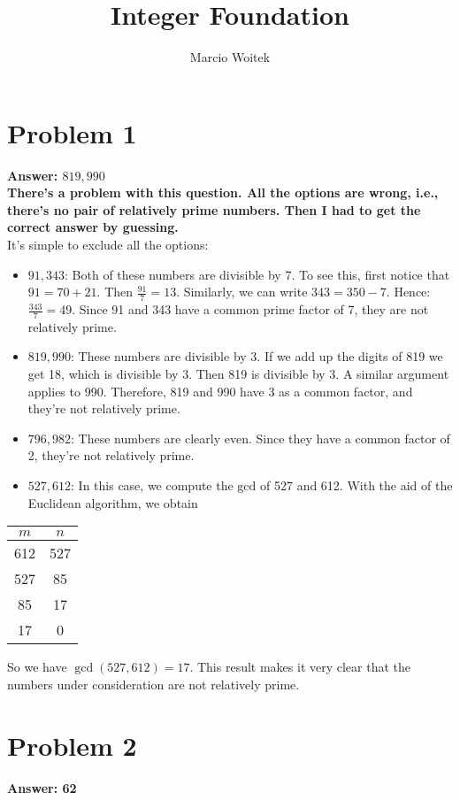 \documentclass[11pt]{article}
\author{Marcio Woitek}
\date{}
\title{Integer Foundation}
\begin{document}
\maketitle
\thispagestyle{empty}
\pagestyle{empty}
\section*{Problem 1}
\label{sec:org629dde8}
\textbf{Answer: \(819,990\)}\\

\textbf{There's a problem with this question. All the options are wrong, i.e., there's
no pair of relatively prime numbers. Then I had to get the correct answer by
guessing.}\\

It's simple to exclude all the options:
\begin{itemize}
\item \(91,343\): Both of these numbers are divisible by 7. To see this, first
notice that \(91=70+21\). Then \(\frac{91}{7}=13\). Similarly, we can
write \(343=350-7\). Hence: \(\frac{343}{7}=49\). Since 91 and 343 have a
common prime factor of 7, they are not relatively prime.
\item \(819,990\): These numbers are divisible by 3. If we add up the digits of
819 we get 18, which is divisible by 3. Then 819 is divisible by 3. A similar
argument applies to 990. Therefore, 819 and 990 have 3 as a common factor, and
they're not relatively prime.
\item \(796,982\): These numbers are clearly even. Since they have a common factor
of 2, they're not relatively prime.
\item \(527,612\): In this case, we compute the \(\mathrm{gcd}\) of 527 and 612.
With the aid of the Euclidean algorithm, we obtain
\end{itemize}
\begin{center}
\begin{tabular}{|c|c|}
\hline
\(m\) & \(n\)\\
\hline
612 & 527\\
527 & 85\\
85 & 17\\
17 & 0\\
\hline
\end{tabular}
\end{center}
So we have \(\gcd(527,612)=17\). This result makes it very clear that the
numbers under consideration are not relatively prime.
\section*{Problem 2}
\label{sec:orgc6995e4}
\textbf{Answer: 62}\\
\end{document}
